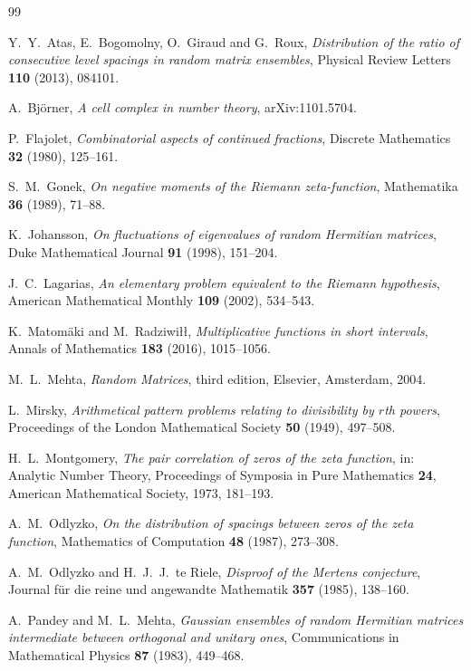 \documentclass[11pt]{amsart}
\numberwithin{equation}{section}
\theoremstyle{plain}
\theoremstyle{definition}
\theoremstyle{remark}
\begin{document}
\begin{thebibliography}{99}

Y.~Y.~Atas, E.~Bogomolny, O.~Giraud and G.~Roux,
\emph{Distribution of the ratio of consecutive level spacings in random
matrix ensembles},
Physical Review Letters \textbf{110} (2013), 084101.

A.~Bj\"orner,
\emph{A cell complex in number theory},
arXiv:1101.5704.

P.~Flajolet,
\emph{Combinatorial aspects of continued fractions},
Discrete Mathematics \textbf{32} (1980), 125--161.

S.~M.~Gonek,
\emph{On negative moments of the Riemann zeta-function},
Mathematika \textbf{36} (1989), 71--88.

K.~Johansson,
\emph{On fluctuations of eigenvalues of random Hermitian matrices},
Duke Mathematical Journal \textbf{91} (1998), 151--204.

J.~C.~Lagarias,
\emph{An elementary problem equivalent to the Riemann hypothesis},
American Mathematical Monthly \textbf{109} (2002), 534--543.

K.~Matom\"aki and M.~Radziwi\l{}\l{},
\emph{Multiplicative functions in short intervals},
Annals of Mathematics \textbf{183} (2016), 1015--1056.

M.~L.~Mehta,
\emph{Random Matrices}, third edition,
Elsevier, Amsterdam, 2004.

L.~Mirsky,
\emph{Arithmetical pattern problems relating to divisibility by $r$th
powers},
Proceedings of the London Mathematical Society \textbf{50} (1949),
497--508.

H.~L.~Montgomery,
\emph{The pair correlation of zeros of the zeta function},
in: Analytic Number Theory,
Proceedings of Symposia in Pure Mathematics \textbf{24},
American Mathematical Society, 1973, 181--193.

A.~M.~Odlyzko,
\emph{On the distribution of spacings between zeros of the zeta
function},
Mathematics of Computation \textbf{48} (1987), 273--308.

A.~M.~Odlyzko and H.~J.~J.~te Riele,
\emph{Disproof of the Mertens conjecture},
Journal f\"ur die reine und angewandte Mathematik \textbf{357} (1985),
138--160.

A.~Pandey and M.~L.~Mehta,
\emph{Gaussian ensembles of random Hermitian matrices intermediate
between orthogonal and unitary ones},
Communications in Mathematical Physics \textbf{87} (1983), 449--468.


\end{thebibliography}
\end{document}

